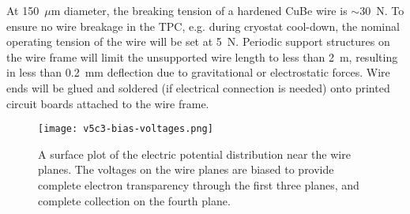 At 150~$\mu$m diameter,  the breaking tension of a hardened CuBe wire is $\sim$30~N.  
To ensure no wire breakage in the TPC, e.g. during cryostat cool-down, the nominal operating tension of the wire will be set at 5~N.  Periodic support structures on the wire frame will
limit the unsupported wire length to less than 2~m, resulting in less than 0.2~mm deflection due to gravitational or electrostatic forces.  Wire ends will be glued and soldered (if electrical connection is needed) 
onto printed circuit boards attached to the wire frame.

\begin{figure}[htbp]
\centering
\texttt{[image: v5c3-bias-voltages.png]}
\caption[Plot of electric potential distribution near the wire planes]{A surface plot of the electric potential distribution near the wire planes.  The voltages on the wire planes are biased to provide complete electron transparency through the first three planes, and complete collection on the fourth plane. }
\label{fig:tpc-bias-voltages}
\end{figure}

